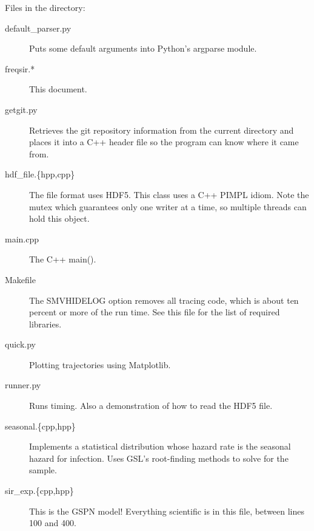 \documentclass{article}
\begin{document}
Files in the directory:
\begin{description}
  \item[default\_parser.py] Puts some default arguments into Python's argparse module.
  \item[freqsir.*] This document.
  \item[getgit.py] Retrieves the git repository information from the current
  directory and places it into a C++ header file so the program can know
  where it came from.
  \item[hdf\_file.\{hpp,cpp\}] The file format uses HDF5. This class
  uses a C++ PIMPL idiom. Note the mutex which guarantees only one
  writer at a time, so multiple threads can hold this object.
  \item[main.cpp] The C++ main().
  \item[Makefile] The SMVHIDELOG option removes all tracing code, which
  is about ten percent or more of the run time. See this file for the
  list of required libraries.
  \item[quick.py] Plotting trajectories using Matplotlib.
  \item[runner.py] Runs timing. Also a demonstration of how to read
  the HDF5 file.
  \item[seasonal.\{cpp,hpp\}] Implements a statistical distribution
  whose hazard rate is the seasonal hazard for infection. Uses
  GSL's root-finding methods to solve for the sample.
  \item[sir\_exp.\{cpp,hpp\}] This is the GSPN model! Everything
  scientific is in this file, between lines 100 and 400.
\end{description}



\end{document}
